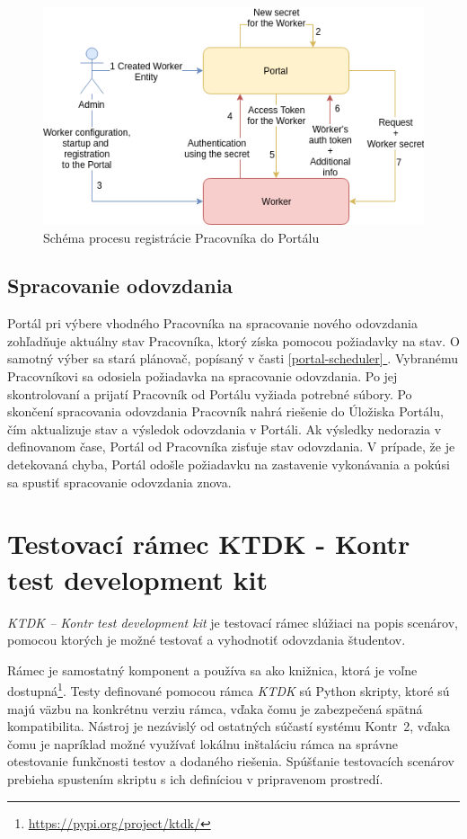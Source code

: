 \documentclass[
  digital, %
  oneside, %
  table,   %
  lof,     %
  lot,   %
]{fithesis3}
\newcommand*{\fullref}[1]{\hyperref[{#1}]{\ref*{#1} \nameref*{#1}}}
\begin{document}
\begin{figure}[!ht]
  \begin{center}
    \includegraphics[width=\textwidth]{imgs/worker-reg.png}
  \end{center}
    \caption{Schéma procesu registrácie Pracovníka do Portálu}
    \label{fig:worker-reg}
\end{figure}

\subsection{Spracovanie odovzdania}
Portál pri výbere vhodného Pracovníka na spracovanie nového odovzdania zohľadňuje aktuálny stav Pracovníka, ktorý získa pomocou požiadavky na stav. O samotný výber sa stará plánovač, popísaný v časti \fullref{portal-scheduler}. Vybranému Pracovníkovi sa odosiela požiadavka na spracovanie odovzdania. Po jej skontrolovaní a prijatí Pracovník od Portálu vyžiada potrebné súbory. Po skončení spracovania odovzdania Pracovník nahrá riešenie do Úložiska Portálu, čím aktualizuje stav a výsledok odovzdania v Portáli. Ak výsledky nedorazia v definovanom čase, Portál od Pracovníka zisťuje stav odovzdania. V prípade, že je detekovaná chyba, Portál odošle požiadavku na zastavenie vykonávania a pokúsi sa spustiť spracovanie odovzdania znova. 

\section{Testovací rámec KTDK - Kontr test development kit}

\emph{KTDK -- Kontr test development kit} je testovací rámec slúžiaci na popis scenárov, pomocou ktorých je možné testovať a vyhodnotiť odovzdania študentov.

Rámec je samostatný komponent a používa sa ako knižnica, ktorá je voľne dostupná\footnote{\url{https://pypi.org/project/ktdk/}}. Testy definované pomocou rámca \emph{KTDK} sú Python skripty, ktoré sú majú väzbu na konkrétnu verziu rámca, vďaka čomu je zabezpečená spätná kompatibilita. Nástroj je nezávislý od ostatných súčastí systému Kontr~2, vďaka čomu je napríklad možné využívať lokálnu inštaláciu rámca na správne otestovanie funkčnosti testov a dodaného riešenia. Spúšťanie testovacích scenárov prebieha spustením skriptu s ich definíciou v pripravenom prostredí.
\end{document}
